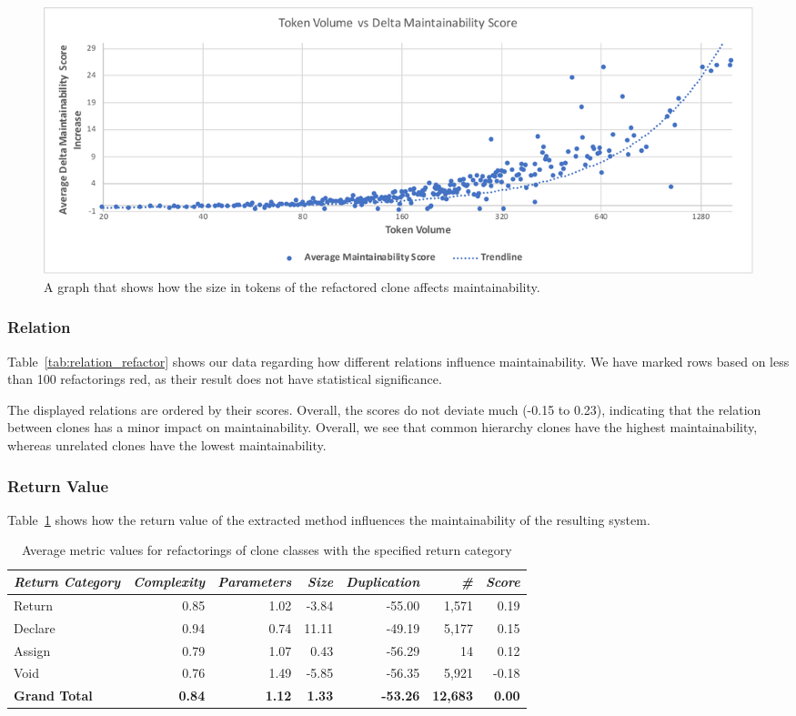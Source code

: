 \documentclass[sigconf,review, table]{acmart}
\begin{document}
\begin{figure}
  \includegraphics[width=1\textwidth]{img/tokenvolume}
  \caption{A graph that shows how the size in tokens of the refactored clone affects maintainability.}
  \label{fig:maintainabilityscore}
\end{figure}

\subsubsection{Relation}
Table~\ref{tab:relation_refactor} shows our data regarding how different relations influence maintainability. We have marked rows based on less than 100 refactorings red, as their result does not have statistical significance.

The displayed relations are ordered by their scores. Overall, the scores do not deviate much (-0.15 to 0.23), indicating that the relation between clones has a minor impact on maintainability. Overall, we see that common hierarchy clones have the highest maintainability, whereas unrelated clones have the lowest maintainability.

\subsubsection{Return Value}
Table~\ref{tab:return} shows how the return value of the extracted method influences the maintainability of the resulting system.

\begin{table}
\centering
\begin{tabular}{@{}lrrrrrr@{}}
\toprule
\textit{\textbf{Return Category}} & \textit{\textbf{Complexity}} & \textit{\textbf{Parameters}} & \textit{\textbf{Size}} & \textit{\textbf{Duplication}} & \textit{\textbf{\#}} & \textit{\textbf{Score}} \\ \midrule
Return & 0.85 & 1.02 & -3.84 & -55.00 & 1,571 & 0.19 \\
Declare & 0.94 & 0.74 & 11.11 & -49.19 & 5,177 & 0.15 \\
\rowcolor[HTML]{FFCCC9}
Assign & 0.79 & 1.07 & 0.43 & -56.29 & 14 & 0.12 \\
Void & 0.76 & 1.49 & -5.85 & -56.35 & 5,921 & -0.18 \\ \midrule
\textbf{Grand Total} & \textbf{0.84} & \textbf{1.12} & \textbf{1.33} & \textbf{-53.26} & \textbf{12,683} & \textbf{0.00} \\ \bottomrule
\end{tabular}
\caption{Average metric values for refactorings of clone classes with the specified return category}
\label{tab:return}
\end{table}
\end{document}
